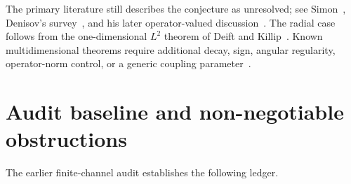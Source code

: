 \documentclass[11pt]{article}
\theoremstyle{definition}
\theoremstyle{remark}
\begin{document}
The primary literature still describes the conjecture as unresolved; see
Simon~\cite{Simon2019}, Denisov's survey~\cite{DenisovSurvey2012}, and his
later operator-valued discussion~\cite{Denisov2022}.  The radial case follows
from the one-dimensional $L^2$ theorem of Deift and
Killip~\cite{DeiftKillip1999}.  Known multidimensional theorems require
additional decay, sign, angular regularity, operator-norm control, or a
generic coupling parameter~\cite{LNS2005,Perelman2005,LaptevSafronov2024,Denisov2025}.

\section{Audit baseline and non-negotiable obstructions}

The earlier finite-channel audit establishes the following ledger.
\end{document}
